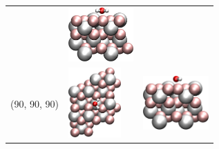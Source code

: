 \documentclass[11pt,DIV=13,BCOR=5mm,a4paper,headinclude]{scrbook}
\begin{document}
\begin{table}[!h]
\begin{tabular}{cp{4cm}p{4cm}}
& \includegraphics[width=2.5cm]{figures/0001/Ausrichtungsbilder/90_90_0-sidetest.png}\\
(90, 90, 90) & \includegraphics[width=2cm,angle=90]{figures/0001/Ausrichtungsbilder/90_90_90-toptest.png} 
& \includegraphics[width=2.5cm]{figures/0001/Ausrichtungsbilder/90_90_90-sidetest.png}\\\bottomrule
\end{tabular}
 \label{tab:orientations}
\end{table}
 
\end{document}
